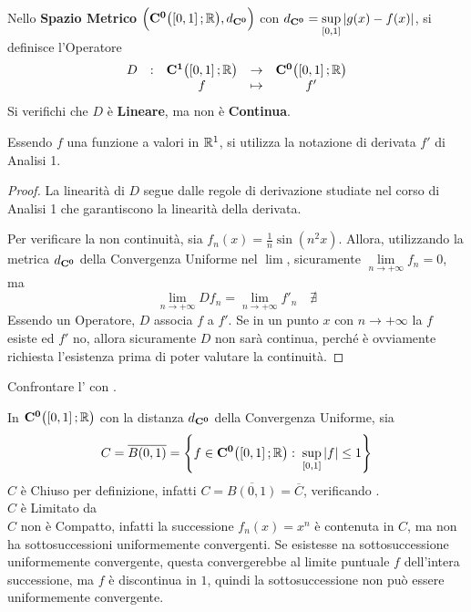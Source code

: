\begin{proposition}
	\label{prop:operat_D_non_cont}
	Nello \textbf{Spazio Metrico} $\Bigl( \mathbf{C^{0}}\bigl( \left[0,1\right]; \mathbb{R} \bigr), d_{\mathbf{C^{0}}} \Bigr)$ con $d_{\mathbf{C^{0}}} = \sup\limits_{\left[0,1\right]} \left|g(x) - f(x)\right|$, si definisce l'Operatore
	\[
		\begin{array}{ccccc} {D} & : & {
			\mathbf{C^{1}}\bigl( \left[0,1\right]; \mathbb{R} \bigr)
		} & \to & {
			\mathbf{C^{0}}\bigl( \left[0,1\right]; \mathbb{R} \bigr)
		} \\ & & {f} & \mapsto & {f'} \\ \end{array}
	\]
	Si verifichi che $D$ è \textbf{Lineare}, ma non è \textbf{Continua}.
	\begin{note}
		Essendo $f$ una funzione a valori in $\mathbb{R}^1$, si utilizza la  notazione di derivata $f'$ di Analisi 1.
	\end{note}
	\begin{proof}
		La linearità di $D$ segue dalle regole di derivazione studiate nel corso di Analisi 1 che garantiscono la linearità della derivata.

		Per verificare la non continuità, sia $f_n(x) = \frac{1}{n} \sin(n^2 x)$. Allora, utilizzando la metrica $d_{\mathbf{C^{0}}}$ della Convergenza Uniforme nel $\lim$, sicuramente $\lim\limits_{n \to +\infty} f_n = 0$, ma
		\[\lim\limits_{n \to +\infty} Df_n = \lim\limits_{n \to +\infty} f'_n \quad \nexists\]
		Essendo un Operatore, $D$ associa $f$ a $f'$. Se in un punto $x$ con $n \to +\infty$ la $f$ esiste ed $f'$ no, allora sicuramente $D$ non sarà continua, perché è ovviamente richiesta l'esistenza prima di poter valutare la continuità.
	\end{proof}
\end{proposition}
\begin{exercise}
	Confrontare l' con .
\end{exercise}
\begin{example}
	\label{ex:ins_chius_lim_non_compl}
	In $\mathbf{C^{0}} \bigl( \left[0,1\right]; \mathbb{R} \bigr)$ con la distanza $d_{\mathbf{C^{0}}}$ della Convergenza Uniforme, sia
	\[C = \overline{B(0, 1)} = \left\{f \in \mathbf{C^{0}}\bigl( \left[0,1\right]; \mathbb{R} \bigr):\; \sup\limits_{\left[0,1\right]} \left|f\right| \leq 1\right\}\]
	$C$ è Chiuso per definizione, infatti $C = \overline{B(0, 1)} = \overline{C}$, verificando .\\
	$C$ è Limitato da \\
	$C$ non è Compatto, infatti la successione $f_n(x) = x^n$ è contenuta in $C$, ma non ha sottosuccessioni uniformemente convergenti. Se esistesse na sottosuccessione uniformemente convergente, questa convergerebbe al limite puntuale $f$ dell'intera successione, ma $f$ è discontinua in $1$, quindi la sottosuccessione non può essere uniformemente convergente.
\end{example}
